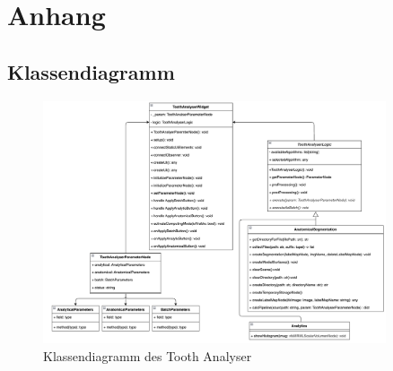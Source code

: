 \chapter{Anhang}
\label{chap:anhang}

\section{Klassendiagramm}
\begin{figure}[h]
	\centering
	\includegraphics[width=0.9\textwidth, angle=90]{img/toothAnalyserClasses.png}
	\caption{Klassendiagramm des Tooth Analyser}
	\label{fig:klassendiagramm_gesamt}
\end{figure}